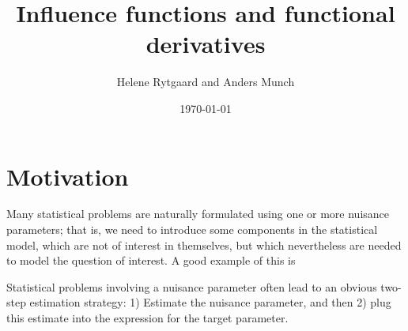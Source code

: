 \documentclass[a4,danish]{article}
\title{Influence functions and functional derivatives}
\author{Helene Rytgaard and Anders Munch}
\date{\today}
\begin{document}
\maketitle

\section{Motivation}
\label{sec:motivation}

Many statistical problems are naturally formulated using one or more nuisance parameters; that is,
we need to introduce some components in the statistical model, which are not of interest in
themselves, but which nevertheless are needed to model the question of interest. A good example of
this is 

Statistical problems involving a nuisance parameter often lead to an obvious two-step estimation
strategy: 1) Estimate the nuisance parameter, and then 2) plug this estimate into the expression for
the target parameter.
\end{document}

